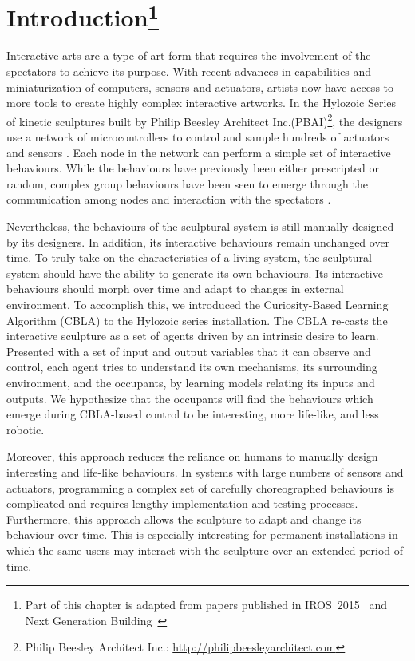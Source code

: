 

\chapter[Introduction]{Introduction\footnote{Part of this chapter is adapted from papers published in IROS~2015~\cite{Chan2015} and Next Generation \mbox{Building}~\cite{Gorbet2015}}} 
\label{chap:intro}

Interactive arts are a type of art form that requires the involvement of the spectators to achieve its purpose. With recent advances in capabilities and miniaturization of computers, sensors and actuators, artists now have access to more tools to create highly complex interactive artworks. In the Hylozoic Series of kinetic sculptures built by Philip Beesley Architect Inc.(PBAI)\footnote{Philip Beesley Architect Inc.: \url{http://philipbeesleyarchitect.com}}, the designers use a network of microcontrollers to control and sample hundreds of actuators and sensors \cite{Beesley2010}\cite{Beesley2010b}. Each node in the network can perform a simple set of interactive behaviours. While the behaviours have previously been either prescripted or random, complex group behaviours have been seen to emerge through the communication among nodes and interaction with the spectators \cite{Beesley2012}. 

Nevertheless, the behaviours of the sculptural system is still manually designed by its designers. In addition, its interactive behaviours remain unchanged over time. To truly take on the characteristics of a living system, the sculptural system should have the ability to generate its own behaviours. Its interactive behaviours should morph over time and adapt to changes in external environment. To accomplish this, we introduced the Curiosity-Based Learning Algorithm (CBLA) to the Hylozoic series installation. The CBLA re-casts the interactive sculpture as a set of agents driven by an intrinsic desire to learn. Presented with a set of input and output variables that it can observe and control, each agent tries to understand its own mechanisms, its surrounding environment, and the occupants, by learning models relating its inputs and outputs. We hypothesize that the occupants will find the behaviours which emerge during CBLA-based control to be interesting, more life-like, and less robotic. 

Moreover, this approach reduces the reliance on humans to manually design interesting and life-like behaviours. In systems with large numbers of sensors and actuators, programming a complex set of carefully choreographed behaviours is complicated and requires lengthy implementation and testing processes. Furthermore, this approach allows the sculpture to adapt and change its behaviour over time. This is especially interesting for permanent installations in which the same users may interact with the sculpture over an extended period of time. 

